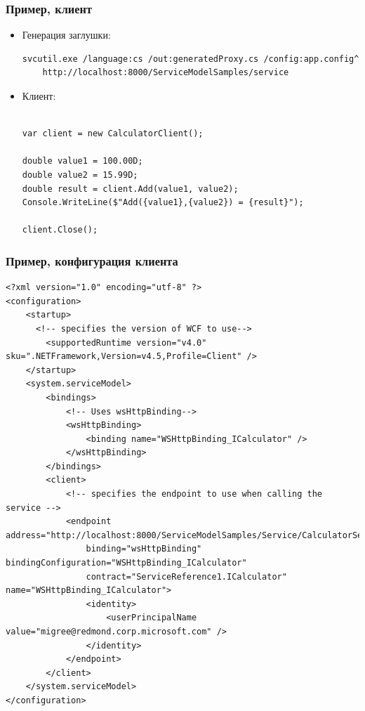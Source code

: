 \documentclass[xetex,mathserif,serif]{beamer}
\begin{document}
    \begin{frame}[fragile]
        \frametitle{Пример, клиент}
        \begin{itemize}
            \item Генерация заглушки: 
                \begin{scriptsize}
                    \begin{verbatim}
svcutil.exe /language:cs /out:generatedProxy.cs /config:app.config^
    http://localhost:8000/ServiceModelSamples/service
                    \end{verbatim}
                \end{scriptsize}
            \item Клиент:
                \begin{footnotesize}
                    \begin{verbatim}

var client = new CalculatorClient();

double value1 = 100.00D;
double value2 = 15.99D;
double result = client.Add(value1, value2);
Console.WriteLine($"Add({value1},{value2}) = {result}");

client.Close();
                    \end{verbatim}
                \end{footnotesize}
        \end{itemize}
    \end{frame}

    \begin{frame}[fragile]
        \frametitle{Пример, конфигурация клиента}
        \begin{ssmall}
            \begin{verbatim}
<?xml version="1.0" encoding="utf-8" ?>  
<configuration>  
    <startup>   
      <!-- specifies the version of WCF to use-->  
        <supportedRuntime version="v4.0" sku=".NETFramework,Version=v4.5,Profile=Client" />  
    </startup>  
    <system.serviceModel>  
        <bindings>  
            <!-- Uses wsHttpBinding-->  
            <wsHttpBinding>  
                <binding name="WSHttpBinding_ICalculator" />  
            </wsHttpBinding>  
        </bindings>  
        <client>  
            <!-- specifies the endpoint to use when calling the service -->  
            <endpoint address="http://localhost:8000/ServiceModelSamples/Service/CalculatorService"  
                binding="wsHttpBinding" bindingConfiguration="WSHttpBinding_ICalculator"  
                contract="ServiceReference1.ICalculator" name="WSHttpBinding_ICalculator">  
                <identity>  
                    <userPrincipalName value="migree@redmond.corp.microsoft.com" />  
                </identity>  
            </endpoint>  
        </client>  
    </system.serviceModel>  
</configuration>
            \end{verbatim}
        \end{ssmall}
    \end{frame}
\end{document}
